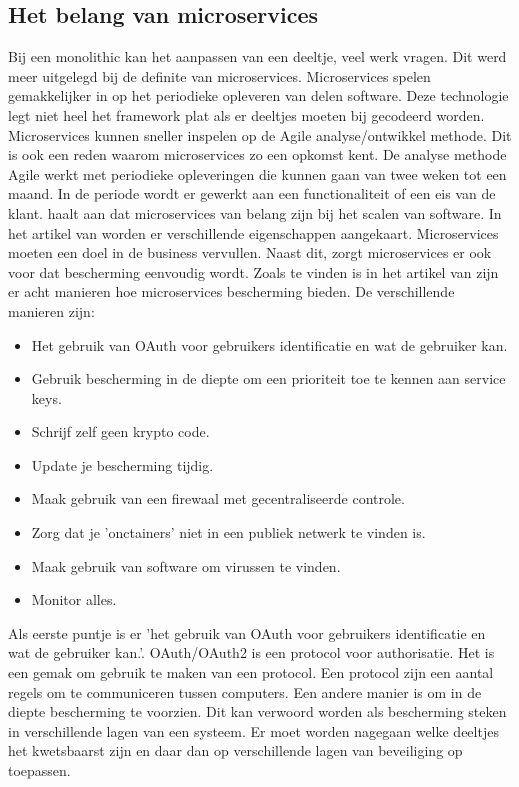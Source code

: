 \subsection{Het belang van microservices}
Bij een monolithic kan het aanpassen van een deeltje, veel werk vragen. Dit werd meer uitgelegd bij de definite van microservices. Microservices spelen gemakkelijker in op het periodieke opleveren van delen software. Deze technologie legt niet heel het framework plat als er deeltjes moeten bij gecodeerd worden. Microservices kunnen sneller inspelen op de Agile analyse/ontwikkel methode. Dit is ook een reden waarom microservices zo een opkomst kent. De analyse methode Agile werkt met periodieke opleveringen die kunnen gaan van twee weken tot een maand. In de periode wordt er gewerkt aan een functionaliteit of een eis van de klant. 
\textcite{series2018} haalt aan dat microservices van belang zijn bij het scalen van software.
In het artikel van \textcite{RDX2016} worden er verschillende eigenschappen aangekaart. Microservices moeten een doel in de business vervullen. Naast dit, zorgt microservices er ook voor dat bescherming eenvoudig wordt. 
Zoals te vinden is in het artikel van \textcite{Troisi2019} zijn er acht manieren hoe microservices bescherming bieden. 
De verschillende manieren zijn:
\begin{itemize}
	\item Het gebruik van OAuth voor gebruikers identificatie en wat de gebruiker kan.
	\item Gebruik bescherming in de diepte om een prioriteit toe te kennen aan service keys.
	\item Schrijf zelf geen krypto code.
	\item Update je bescherming tijdig.
	\item Maak gebruik van een firewaal met gecentraliseerde controle.
	\item Zorg dat je 'onctainers' niet in een publiek netwerk te vinden is. 
	\item Maak gebruik van software om virussen te vinden.
	\item Monitor alles.
\end{itemize}
Als eerste puntje is er 'het gebruik van OAuth voor gebruikers identificatie en wat de gebruiker kan.'.  OAuth/OAuth2 is een protocol voor authorisatie. Het is een gemak om gebruik te maken van een protocol. Een protocol zijn een aantal regels om te communiceren tussen computers. 
Een andere manier is om in de diepte bescherming te voorzien. Dit kan verwoord worden als bescherming steken in verschillende lagen van een systeem. Er moet worden nagegaan welke deeltjes het kwetsbaarst zijn en daar dan op verschillende lagen van beveiliging op toepassen. 

